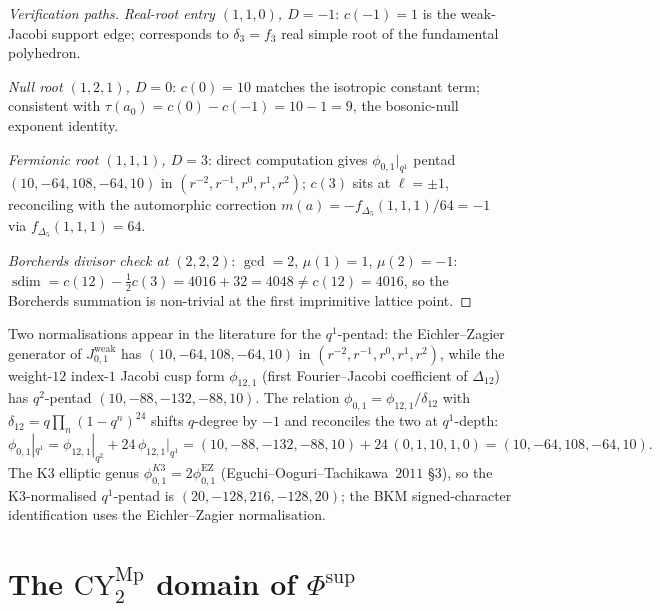\begin{proof}[Verification paths]
\emph{Real-root entry $(1, 1, 0)$, $D = -1$}: $c(-1) = 1$ is the weak-Jacobi support edge; corresponds to $\delta_3 = f_3$ real simple root of the fundamental polyhedron.

\emph{Null root $(1, 2, 1)$, $D = 0$}: $c(0) = 10$ matches the isotropic constant term; consistent with $\tau(a_0) = c(0) - c(-1) = 10 - 1 = 9$, the bosonic-null exponent identity.

\emph{Fermionic root $(1, 1, 1)$, $D = 3$}: direct computation gives $\phi_{0, 1}|_{q^1}$ pentad $(10, -64, 108, -64, 10)$ in $(r^{-2}, r^{-1}, r^0, r^1, r^2)$; $c(3)$ sits at $\ell = \pm 1$, reconciling with the automorphic correction $m(a) = -f_{\Delta_5}(1, 1, 1)/64 = -1$ via $f_{\Delta_5}(1, 1, 1) = 64$.

\emph{Borcherds divisor check at $(2, 2, 2)$}: $\gcd = 2$, $\mu(1) = 1$, $\mu(2) = -1$: \(\operatorname{sdim}=c(12)-\tfrac{1}{2}c(3)=4016+32=4048\neq c(12)=4016\), so the Borcherds summation is non-trivial at the first imprimitive lattice point.
\end{proof}

\begin{remark}
\label{rem:k3e-q1-pentad-normalisation}
Two normalisations appear in the literature for the $q^1$-pentad: the Eichler--Zagier generator of $J_{0, 1}^{\mathrm{weak}}$ has $(10, -64, 108, -64, 10)$ in $(r^{-2}, r^{-1}, r^0, r^1, r^2)$, while the weight-$12$ index-$1$ Jacobi cusp form $\phi_{12, 1}$ (first Fourier--Jacobi coefficient of $\Delta_{12}$) has $q^2$-pentad $(10, -88, -132, -88, 10)$. The relation $\phi_{0, 1} = \phi_{12, 1}/\delta_{12}$ with $\delta_{12} = q \prod_n (1 - q^n)^{24}$ shifts $q$-degree by $-1$ and reconciles the two at $q^1$-depth:
\[
\phi_{0, 1}|_{q^1} = \phi_{12, 1}|_{q^2} + 24\, \phi_{12, 1}|_{q^1} = (10, -88, -132, -88, 10) + 24\,(0, 1, 10, 1, 0) = (10, -64, 108, -64, 10).
\]
The K3 elliptic genus $\phi_{0, 1}^{K3} = 2 \phi_{0, 1}^{\mathrm{EZ}}$ (Eguchi--Ooguri--Tachikawa~$2011$ \S$3$), so the K3-normalised $q^1$-pentad is $(20, -128, 216, -128, 20)$; the BKM signed-character identification uses the Eichler--Zagier normalisation.
\end{remark}

\section{The \texorpdfstring{$\mathrm{CY}_2^{\mathrm{Mp}}$}{CY-2-Mp} domain of \texorpdfstring{$\Phi^{\mathrm{sup}}$}{Phi-sup}}
\label{sec:k3e-CY2Mp-domain}

